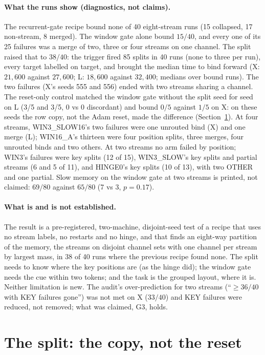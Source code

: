 \documentclass[11pt]{article}
\newcommand{\arm}[1]{\textsf{#1}}
\begin{document}
\paragraph{What the runs show (diagnostics, not claims).} The recurrent-gate recipe bound none of 40 eight-stream runs (15 collapsed, 17 non-stream, 8 merged). The window gate alone bound $15/40$, and every one of its 25 failures was a merge of two, three or four streams on one channel. The split raised that to $38/40$: the trigger fired 85 splits in 40 runs (none to three per run), every target labelled on target, and brought the median time to bind forward (X: $21{,}600$ against $27{,}600$; L: $18{,}600$ against $32{,}400$; medians over bound runs). The two failures (X's seeds 555 and 556) ended with two streams sharing a channel. The reset-only control matched the window gate without the split seed for seed on L (3/5 and 3/5, 0 vs 0 discordant) and bound $0/5$ against $1/5$ on X: on these seeds the row copy, not the Adam reset, made the difference (Section~\ref{sec:split}). At four streams, \arm{WIN3\_SLOW16}'s two failures were one unrouted bind (X) and one merge (L); \arm{WIN16\_A}'s thirteen were four position splits, three merges, four unrouted binds and two others. At two streams no arm failed by position; \arm{WIN3}'s failures were key splits (12 of 15), \arm{WIN3\_SLOW}'s key splits and partial streams (6 and 5 of 11), and \arm{HINGE0}'s key splits (10 of 13), with two OTHER and one partial. Slow memory on the window gate at two streams is printed, not claimed: $69/80$ against $65/80$ (7 vs 3, $p = 0.17$).

\paragraph{What is and is not established.} The result is a pre-registered, two-machine, disjoint-seed test of a recipe that uses no stream labels, no restarts and no hinge, and that finds an eight-way partition of the memory, the streams on disjoint channel sets with one channel per stream by largest mass, in 38 of 40 runs where the previous recipe found none. The split needs to know where the key positions are (as the hinge did); the window gate needs the cue within two tokens; and the task is the grouped layout, where it is. Neither limitation is new. The audit's over-prediction for two streams (``$\geq 36/40$ with KEY failures gone'') was not met on X ($33/40$) and KEY failures were reduced, not removed; what was claimed, G3, holds.

\section{The split: the copy, not the reset}
\label{sec:split}
\end{document}
